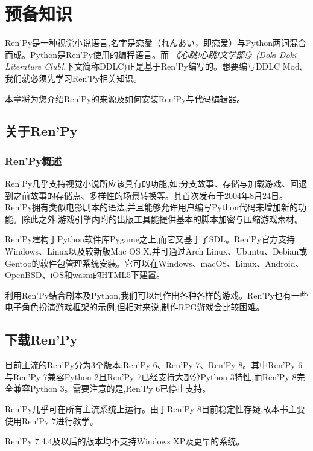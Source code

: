 \chapter{预备知识}
Ren'Py是一种视觉小说语言,名字是恋愛（れんあい，即恋爱）与Python两词混合而成。Python是Ren'Py使用的编程语言。而 \textit{《心跳!心跳!文学部!》(Doki Doki Literature Club!},下文简称DDLC)正是基于Ren'Py编写的。想要编写DDLC Mod,我们就必须先学习Ren'Py相关知识。

本章将为您介绍Ren'Py的来源及如何安装Ren'Py与代码编辑器。

\section{关于Ren'Py}
\subsection{Ren'Py概述}
Ren'Py几乎支持视觉小说所应该具有的功能,如:分支故事、存储与加载游戏、回退到之前故事的存储点、多样性的场景转换等。其首次发布于2004年8月24日。Ren'Py拥有类似电影剧本的语法,并且能够允许用户编写Python代码来增加新的功能。除此之外,游戏引擎内附的出版工具能提供基本的脚本加密与压缩游戏素材。

Ren'Py建构于Python软件库Pygame之上,而它又基于了SDL。Ren'Py官方支持Windows、Linux以及较新版Mac OS X,并可通过Arch Linux、Ubuntu、Debian或Gentoo的软件包管理系统安装。它可以在Windows、macOS、Linux、Android、OpenBSD、iOS和wasm的HTML5下建置。

利用Ren'Py结合剧本及Python,我们可以制作出各种各样的游戏。Ren'Py也有一些电子角色扮演游戏框架的示例,但相对来说,制作RPG游戏会比较困难。

\section{下载Ren'Py}
目前主流的Ren'Py分为3个版本:Ren'Py 6、Ren'Py 7、Ren'Py 8。其中Ren'Py 6与Ren'Py 7兼容Python 2且Ren'Py 7已经支持大部分Python 3特性,而Ren'Py 8完全兼容Python 3。需要注意的是,Ren'Py 6已停止支持。

Ren'Py几乎可在所有主流系统上运行。由于Ren'Py 8目前稳定性存疑,故本书主要使用Ren'Py 7进行教学。

\begin{Comment}
Ren'Py 7.4.4及以后的版本均不支持Windows XP及更早的系统。
\end{Comment}

